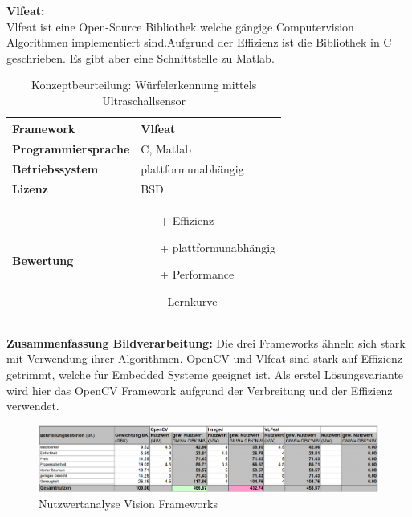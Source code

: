 \documentclass[../../main.tex]{subfiles}
\begin{document}
        \textbf{Vlfeat: }\\
        Vlfeat ist eine Open-Source Bibliothek welche gängige Computervision Algorithmen implementiert sind.Aufgrund der Effizienz ist die Bibliothek in C geschrieben. Es gibt aber eine Schnittstelle zu Matlab. 
        \begin{flushleft}
            \begin{table}[h]
            \begin{tabular}{ | l | p{11cm} |}
            \hline
            \textbf{Framework} & Vlfeat \\ \hline
            \textbf{Programmiersprache} & C, Matlab \\ \hline
            \textbf{Betriebssystem} & plattformunabhängig \\ \hline
            \textbf{Lizenz} & BSD \\ \hline
            \textbf{Bewertung} &  \begin{itemize}
                                    \item[+] Effizienz
                                    \item[+] plattformunabhängig 
                                    \item[+] Performance
                                    \item[-] Lernkurve 
                                  \end{itemize} \\ \hline
            \end{tabular}
            \caption{Konzeptbeurteilung: Würfelerkennung mittels Ultraschallsensor}
            \label{tab:konzept_wurfel_ultraschall}
            \end{table}
        \end{flushleft}

        \textbf{Zusammenfassung Bildverarbeitung: }
        Die drei Frameworks ähneln sich stark mit Verwendung ihrer Algorithmen. OpenCV und Vlfeat sind stark auf Effizienz getrimmt, welche für Embedded Systeme geeignet ist. Als erstel Lösungsvariante wird hier das OpenCV Framework aufgrund der Verbreitung und der Effizienz verwendet.

        \begin{figure}[H] 
            \centering
            \includegraphics[width=1\textwidth]{Nutzwert_Vision.png}
            \caption{Nutzwertanalyse Vision Frameworks}
            \label{fig:vision_nutzwert}
        \end{figure}
\end{document}
